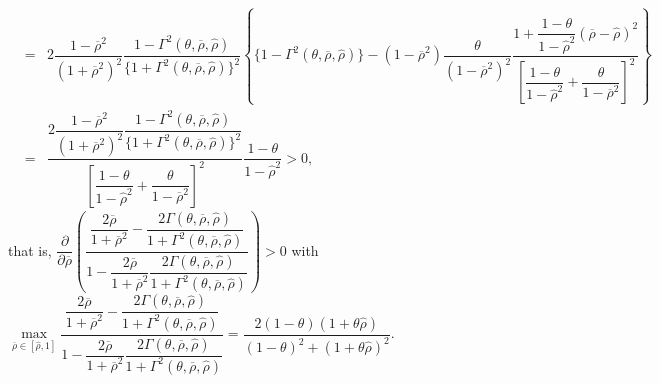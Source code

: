 \documentclass[10pt]{article}
\begin{document}
{\begin{eqnarray*}
& = & 2 \dfrac{1 - \overline{\rho}^2}{(1 + \overline{\rho}^2)^2} \dfrac{1 - \Gamma^2 (\theta, \overline{\rho}, {\hat \rho})}{\{ 1 + \Gamma^2 (\theta, \overline{\rho}, {\hat \rho}) \}^2} \left\{ \{ 1 - \Gamma^2 (\theta, \overline{\rho}, {\hat \rho}) \} - (1 - \overline{\rho}^2) \dfrac{\theta}{(1 - \overline{\rho}^2)^2} \dfrac{1 + \dfrac{1 - \theta}{1 - {\hat \rho}^2} (\overline{\rho} - \hat{\rho})^2}{\left[ \dfrac{1 - \theta}{1 - {\hat \rho}^2} + \dfrac{\theta}{1 - \overline{\rho}^2} \right]^2} \right\} \\
& = & \dfrac{2 \dfrac{1 - \overline{\rho}^2}{(1 + \overline{\rho}^2)^2} \dfrac{1 - \Gamma^2 (\theta, \overline{\rho}, {\hat \rho})}{\{ 1 + \Gamma^2 (\theta, \overline{\rho}, {\hat \rho}) \}^2}}{\left[ \dfrac{1 - \theta}{1 - {\hat \rho}^2} + \dfrac{\theta}{1 - \overline{\rho}^2} \right]^2} \dfrac{1 - \theta}{1 - {\hat \rho}^2} > 0,
\end{eqnarray*}}
that is, {\footnotesize $ \dfrac{\partial}{\partial \overline{\rho}} \left( \dfrac{\dfrac{2 \overline{\rho}}{1 + \overline{\rho}^2} - \dfrac{2 \Gamma (\theta, \overline{\rho}, {\hat \rho})}{1 + \Gamma^2 (\theta, \overline{\rho}, {\hat \rho})}}{1 - \dfrac{2 \overline{\rho}}{1 + \overline{\rho}^2} \dfrac{2 \Gamma (\theta, \overline{\rho}, {\hat \rho})}{1 + \Gamma^2 (\theta, \overline{\rho}, {\hat \rho})}} \right) > 0 $} with
{\footnotesize $ \max\limits_{\overline{\rho} \in [\hat{\rho}, 1]} \dfrac{\dfrac{2 \overline{\rho}}{1 + \overline{\rho}^2} - \dfrac{2 \Gamma (\theta, \overline{\rho}, {\hat \rho})}{1 + \Gamma^2 (\theta, \overline{\rho}, {\hat \rho})}}{1 - \dfrac{2 \overline{\rho}}{1 + \overline{\rho}^2} \dfrac{2 \Gamma (\theta, \overline{\rho}, {\hat \rho})}{1 + \Gamma^2 (\theta, \overline{\rho}, {\hat \rho})}} = \dfrac{2 (1 - \theta) (1 + \theta \hat{\rho})}{(1 - \theta)^2 + (1 + \theta\hat{\rho})^2} $}.
\end{document}
